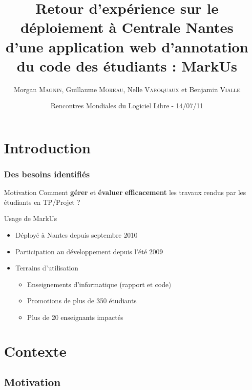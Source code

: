 \documentclass[hyperref,french,usenames,xcolor=dvipsnames]{beamer}
\title[REX MarkUs]%
{Retour d’expérience sur le déploiement à Centrale Nantes d’une application web d’annotation du code des étudiants : MarkUs}
\author[M. \textsc{Magnin}, G. \textsc{Moreau}, N. \textsc{Varoquaux}, B. \textsc{Vialle}]%
{Morgan \textsc{Magnin}, Guillaume \textsc{Moreau}, Nelle \textsc{Varoquaux} et Benjamin \textsc{Vialle}
}
\institute[ECN]{
\structure{
École Centrale de Nantes}
}
\date[14/07/2011]{Rencontres Mondiales du Logiciel Libre - 14/07/11}
\begin{document}
\frame{\titlepage}


\section{Introduction}

\frame
{
  \frametitle{Des besoins identifiés}

\begin{alertblock}{Motivation}
Comment \textbf{gérer} et \textbf{évaluer} \textbf{efficacement} les travaux rendus par les étudiants en TP/Projet ?
\end{alertblock}

\begin{block}{Usage de MarkUs}
\begin{itemize}
\item Déployé à Nantes depuis septembre 2010
\item Participation au développement depuis l'été 2009
\item Terrains d'utilisation
\begin{itemize}
\item Enseignements d'informatique (rapport et code)
\item Promotions de plus de 350 étudiants
\item Plus de 20 enseignants impactés
\end{itemize}
\end{itemize}
\end{block}
}

\section{Contexte}

\subsection*{Motivation}
\end{document}
